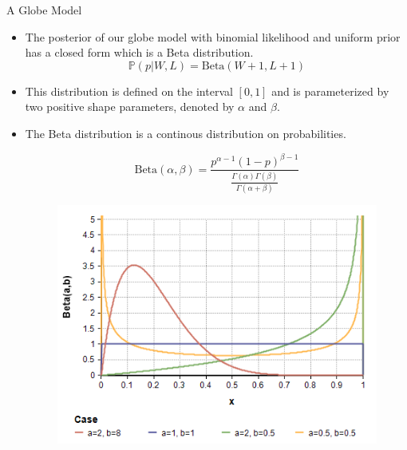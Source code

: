 \documentclass[handout]{beamer}
\begin{document}
\begin{frame}{A Globe Model}
\scriptsize{

\begin{itemize}
\item The posterior of our globe model with binomial likelihood and uniform prior has a closed form which is a Beta distribution.
\begin{displaymath}
\mathbb{P}(p|W,L) = \text{Beta}(W+1 , L+1)
\end{displaymath}

\item This distribution is defined on the interval $[0, 1]$ and is parameterized by two positive shape parameters, denoted by $\alpha$ and $\beta$.

\item The Beta distribution is a continous distribution on probabilities.

\begin{displaymath}
\text{Beta}(\alpha,\beta)=\frac{p^{\alpha-1}(1-p)^{\beta-1}}{\frac{\Gamma(\alpha)\Gamma(\beta)}{\Gamma(\alpha + \beta)}}
\end{displaymath}

\begin{figure}[h!]
	\centering
	\includegraphics[scale=0.6]{pics/Beta(a,b).png}
\end{figure}

\end{itemize}

} 

\end{frame}
\end{document}
